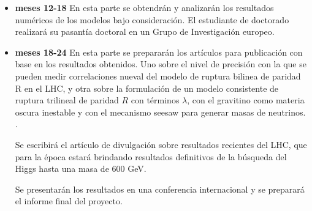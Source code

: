 \begin{itemize}
\item \textbf{meses 12-18} En esta parte se obtendrán y analizarán los
  resultados numéricos de los modelos bajo consideración. El
  estudiante de doctorado realizará su pasantía doctoral en un Grupo
  de Investigación europeo.

\item \textbf{meses 18-24} En esta parte se prepararán los artículos
  para publicación con base en los resultados obtenidos. Uno sobre el
  nivel de precisión con la que se pueden medir correlaciones nueval
  del modelo de ruptura bilinea de paridad R en el LHC, y otra sobre
  la formulación de un modelo consistente de ruptura trilineal de
  paridad $R$ con términos $\lambda$, con el gravitino como materia
  oscura inestable y con el mecanismo seesaw para generar masas de
  neutrinos. .

  Se escribirá el artículo de divulgación sobre resultados recientes
  del LHC, que para la época estará brindando resultados definitivos
  de la búsqueda del Higgs hasta una masa de 600 GeV.

  Se presentarán los resultados en una conferencia internacional y se
  preparará el informe final del proyecto.
\end{itemize}


